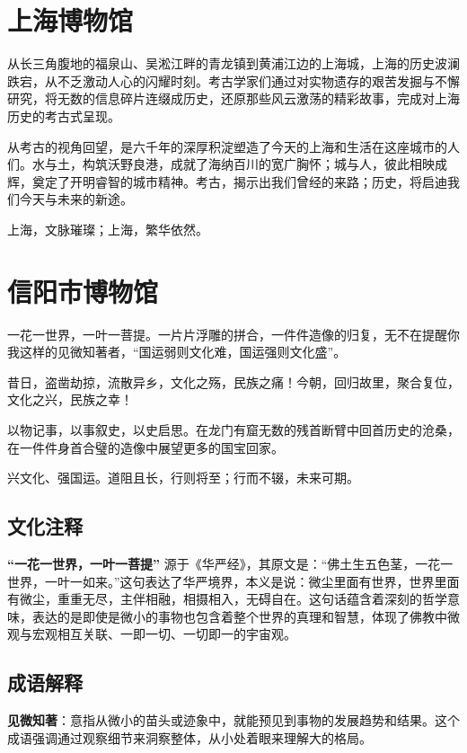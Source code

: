 \newpage

\section*{上海博物馆}

从长三角腹地的福泉山、吴淞江畔的青龙镇到黄浦江边的上海城，上海的历史波澜跌宕，从不乏激动人心的闪耀时刻。考古学家们通过对实物遗存的艰苦发掘与不懈研究，将无数的信息碎片连缀成历史，还原那些风云激荡的精彩故事，完成对上海历史的考古式呈现。

从考古的视角回望，是六千年的深厚积淀塑造了今天的上海和生活在这座城市的人们。水与土，构筑沃野良港，成就了海纳百川的宽广胸怀；城与人，彼此相映成辉，奠定了开明睿智的城市精神。考古，揭示出我们曾经的来路；历史，将启迪我们今天与未来的新途。

上海，文脉璀璨；上海，繁华依然。

\newpage

\section*{信阳市博物馆}

一花一世界，一叶一菩提。一片片浮雕的拼合，一件件造像的归复，无不在提醒你我这样的见微知著者，“国运弱则文化难，国运强则文化盛”。

昔日，盗凿劫掠，流散异乡，文化之殇，民族之痛！今朝，回归故里，聚合复位，文化之兴，民族之幸！

以物记事，以事叙史，以史启思。在龙门有窟无数的残首断臂中回首历史的沧桑，在一件件身首合璧的造像中展望更多的国宝回家。

兴文化、强国运。道阻且长，行则将至；行而不辍，未来可期。

\subsection*{文化注释}

\textbf{“一花一世界，一叶一菩提”} 源于《华严经》，其原文是：“佛土生五色茎，一花一世界，一叶一如来。”这句表达了华严境界，本义是说：微尘里面有世界，世界里面有微尘，重重无尽，主伴相融，相摄相入，无碍自在。这句话蕴含着深刻的哲学意味，表达的是即使是微小的事物也包含着整个世界的真理和智慧，体现了佛教中微观与宏观相互关联、一即一切、一切即一的宇宙观。

\subsection*{成语解释}

\textbf{见微知著}：意指从微小的苗头或迹象中，就能预见到事物的发展趋势和结果。这个成语强调通过观察细节来洞察整体，从小处着眼来理解大的格局。


